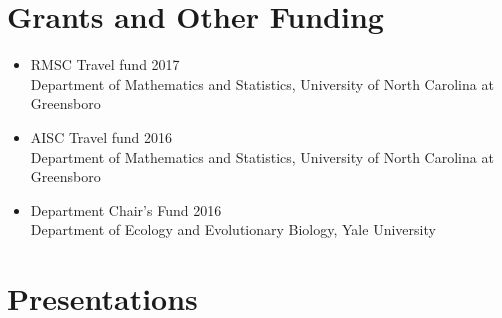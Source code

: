 \documentclass[11pt,a4paper,sans]{moderncv}        %
\begin{document}
\section{Grants and Other Funding}
\begin{itemize}

\item RMSC Travel fund  \hfill 2017\\ 
{\footnotesize Department of Mathematics and Statistics, University of North Carolina at Greensboro}\\  

\item AISC Travel fund  \hfill 2016\\ 
{\footnotesize Department of Mathematics and Statistics, University of North Carolina at Greensboro}\\

\item Department Chair’s Fund \hfill 2016\\ 
{\footnotesize Department of Ecology and Evolutionary Biology, Yale University}\\
  
\end{itemize}

\section{Presentations}
\end{document}
